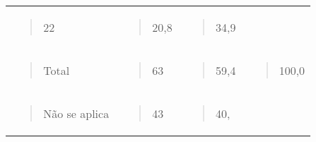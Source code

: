 \begin{longtable}[]{@{}llll@{}}
\begin{minipage}[t]{0.24\columnwidth}
\begin{quote}
22
\end{quote}\strut
\end{minipage} & \begin{minipage}[t]{0.24\columnwidth}\raggedright\strut
\begin{quote}
20,8
\end{quote}\strut
\end{minipage} & \begin{minipage}[t]{0.24\columnwidth}\raggedright\strut
\begin{quote}
34,9
\end{quote}\strut
\end{minipage}\tabularnewline
\begin{minipage}[t]{0.24\columnwidth}\raggedright\strut
\begin{quote}
Total
\end{quote}\strut
\end{minipage} & \begin{minipage}[t]{0.24\columnwidth}\raggedright\strut
\begin{quote}
63
\end{quote}\strut
\end{minipage} & \begin{minipage}[t]{0.24\columnwidth}\raggedright\strut
\begin{quote}
59,4
\end{quote}\strut
\end{minipage} & \begin{minipage}[t]{0.24\columnwidth}\raggedright\strut
\begin{quote}
100,0
\end{quote}\strut
\end{minipage}\tabularnewline
\begin{minipage}[t]{0.24\columnwidth}\raggedright\strut
\begin{quote}
Não se aplica
\end{quote}\strut
\end{minipage} & \begin{minipage}[t]{0.24\columnwidth}\raggedright\strut
\begin{quote}
43
\end{quote}\strut
\end{minipage} & \begin{minipage}[t]{0.24\columnwidth}\raggedright\strut
\begin{quote}
40,
\end{quote}\strut
\end{minipage} & \begin{minipage}[t]{0.24\columnwidth}\raggedright\strut

\end{minipage}
\end{longtable}
